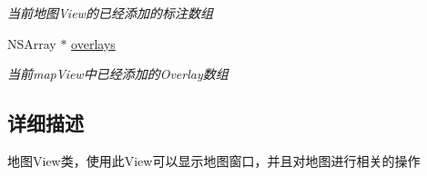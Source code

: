 \begin{DoxyCompactItemize}
\begin{DoxyCompactList}\small\item\em 当前地图\-View的已经添加的标注数组 \end{DoxyCompactList}\item 
\hypertarget{interface_b_m_k_map_view_a6c673c46ad9f146f80e48d82ebcf934b}{N\-S\-Array $\ast$ \hyperlink{interface_b_m_k_map_view_a6c673c46ad9f146f80e48d82ebcf934b}{overlays}}\label{interface_b_m_k_map_view_a6c673c46ad9f146f80e48d82ebcf934b}

\begin{DoxyCompactList}\small\item\em 当前map\-View中已经添加的\-Overlay数组 \end{DoxyCompactList}\end{DoxyCompactItemize}


\subsection{详细描述}
地图\-View类，使用此\-View可以显示地图窗口，并且对地图进行相关的操作 

